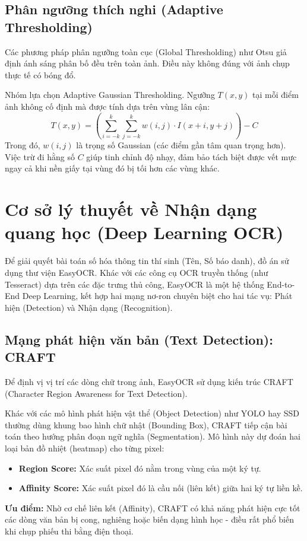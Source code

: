 \documentclass[6pt, a4paper]{report}
\begin{document}
	\subsection{Phân ngưỡng thích nghi (Adaptive Thresholding)}
	Các phương pháp phân ngưỡng toàn cục (Global Thresholding) như Otsu giả định ánh sáng phân bố đều trên toàn ảnh. Điều này không đúng với ảnh chụp thực tế có bóng đổ.
	
	Nhóm lựa chọn Adaptive Gaussian Thresholding. Ngưỡng $T(x,y)$ tại mỗi điểm ảnh không cố định mà được tính dựa trên vùng lân cận:
	\begin{equation}
		T(x, y) = \left( \sum_{i=-k}^{k} \sum_{j=-k}^{k} w(i,j) \cdot I(x+i, y+j) \right) - C
	\end{equation}
	Trong đó, $w(i,j)$ là trọng số Gaussian (các điểm gần tâm quan trọng hơn). Việc trừ đi hằng số $C$ giúp tinh chỉnh độ nhạy, đảm bảo tách biệt được vết mực ngay cả khi nền giấy tại vùng đó bị tối hơn các vùng khác.
	
	\section{Cơ sở lý thuyết về Nhận dạng quang học (Deep Learning OCR)}
	
	Để giải quyết bài toán số hóa thông tin thí sinh (Tên, Số báo danh), đồ án sử dụng thư viện EasyOCR. Khác với các công cụ OCR truyền thống (như Tesseract) dựa trên các đặc trưng thủ công, EasyOCR là một hệ thống End-to-End Deep Learning, kết hợp hai mạng nơ-ron chuyên biệt cho hai tác vụ: Phát hiện (Detection) và Nhận dạng (Recognition).
	
	\subsection{Mạng phát hiện văn bản (Text Detection): CRAFT}
	Để định vị vị trí các dòng chữ trong ảnh, EasyOCR sử dụng kiến trúc CRAFT (Character Region Awareness for Text Detection). 
	
	Khác với các mô hình phát hiện vật thể (Object Detection) như YOLO hay SSD thường dùng khung bao hình chữ nhật (Bounding Box), CRAFT tiếp cận bài toán theo hướng phân đoạn ngữ nghĩa (Segmentation). Mô hình này dự đoán hai loại bản đồ nhiệt (heatmap) cho từng pixel:
	\begin{itemize}
		\item \textbf{Region Score:} Xác suất pixel đó nằm trong vùng của một ký tự.
		\item \textbf{Affinity Score:} Xác suất pixel đó là cầu nối (liên kết) giữa hai ký tự liền kề.
	\end{itemize}
	\textbf{Ưu điểm:} Nhờ cơ chế liên kết (Affinity), CRAFT có khả năng phát hiện cực tốt các dòng văn bản bị cong, nghiêng hoặc biến dạng hình học - điều rất phổ biến khi chụp phiếu thi bằng điện thoại.
	
\end{document}
